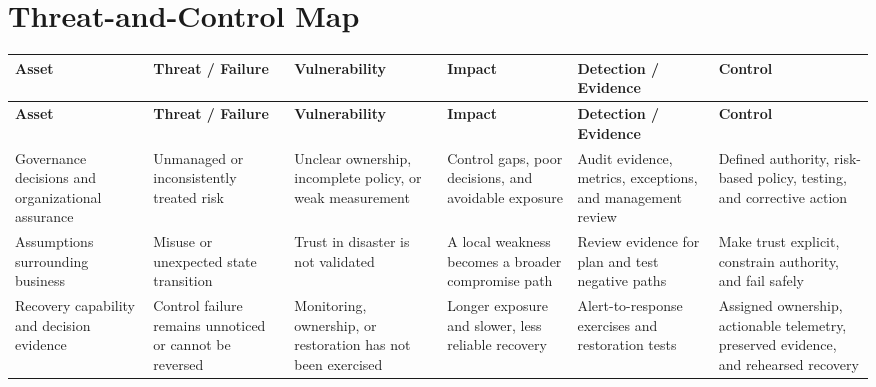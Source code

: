 \documentclass[11pt,letterpaper]{article}
\begin{document}
\section*{Threat-and-Control Map}
\begingroup\scriptsize\setlength{\tabcolsep}{2pt}
\begin{longtable}{>{\raggedright\arraybackslash}p{}>{\raggedright\arraybackslash}p{}>{\raggedright\arraybackslash}p{}>{\raggedright\arraybackslash}p{}>{\raggedright\arraybackslash}p{}>{\raggedright\arraybackslash}p{}}
\toprule\rowcolor{Navy}\color{white}\textbf{Asset} & \color{white}\textbf{Threat / Failure} & \color{white}\textbf{Vulnerability} & \color{white}\textbf{Impact} & \color{white}\textbf{Detection / Evidence} & \color{white}\textbf{Control}\\\midrule
\endfirsthead
\toprule\rowcolor{Navy}\color{white}\textbf{Asset} & \color{white}\textbf{Threat / Failure} & \color{white}\textbf{Vulnerability} & \color{white}\textbf{Impact} & \color{white}\textbf{Detection / Evidence} & \color{white}\textbf{Control}\\\midrule
\endhead
Governance decisions and organizational assurance & Unmanaged or inconsistently treated risk & Unclear ownership, incomplete policy, or weak measurement & Control gaps, poor decisions, and avoidable exposure & Audit evidence, metrics, exceptions, and management review & Defined authority, risk-based policy, testing, and corrective action\\\midrule
Assumptions surrounding business & Misuse or unexpected state transition & Trust in disaster is not validated & A local weakness becomes a broader compromise path & Review evidence for plan and test negative paths & Make trust explicit, constrain authority, and fail safely\\\midrule
Recovery capability and decision evidence & Control failure remains unnoticed or cannot be reversed & Monitoring, ownership, or restoration has not been exercised & Longer exposure and slower, less reliable recovery & Alert-to-response exercises and restoration tests & Assigned ownership, actionable telemetry, preserved evidence, and rehearsed recovery\\\midrule
\bottomrule
\end{longtable}
\endgroup
\end{document}
